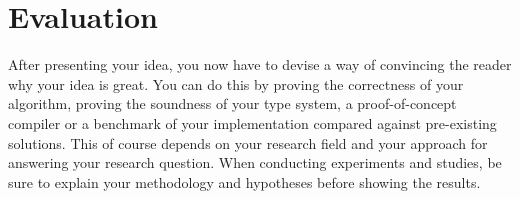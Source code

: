 \chapter{Evaluation}\label{sec:evaluation}
After presenting your idea, you now have to devise a way of convincing the reader why your idea is great.
You can do this by proving the correctness of your algorithm, proving the soundness of your type system, a proof-of-concept compiler or a benchmark of your implementation compared against pre-existing solutions.
This of course depends on your research field and your approach for answering your research question.
When conducting experiments and studies, be sure to explain your methodology and hypotheses before showing the results.
